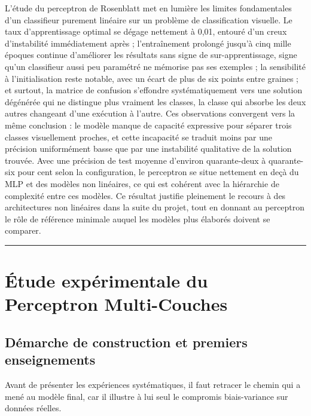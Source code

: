 \documentclass[11pt,a4paper]{report}
\begin{document}
L'étude du perceptron de Rosenblatt met en lumière les limites
fondamentales d'un classifieur purement linéaire sur un problème de
classification visuelle. Le taux d'apprentissage optimal se dégage
nettement à 0,01, entouré d'un creux d'instabilité immédiatement après ;
l'entraînement prolongé jusqu'à cinq mille époques continue d'améliorer
les résultats sans signe de sur-apprentissage, signe qu'un classifieur
aussi peu paramétré ne mémorise pas ses exemples ; la sensibilité à
l'initialisation reste notable, avec un écart de plus de six points
entre graines ; et surtout, la matrice de confusion s'effondre
systématiquement vers une solution dégénérée qui ne distingue plus
vraiment les classes, la classe qui absorbe les deux autres changeant
d'une exécution à l'autre. Ces observations convergent vers la même
conclusion : le modèle manque de capacité expressive pour séparer trois
classes visuellement proches, et cette incapacité se traduit moins par
une précision uniformément basse que par une instabilité qualitative de
la solution trouvée. Avec une précision de test moyenne d'environ
quarante-deux à quarante-six pour cent selon la configuration, le
perceptron se situe nettement en deçà du MLP et des modèles non
linéaires, ce qui est cohérent avec la hiérarchie de complexité entre
ces modèles. Ce résultat justifie pleinement le recours à des
architectures non linéaires dans la suite du projet, tout en donnant au
perceptron le rôle de référence minimale auquel les modèles plus
élaborés doivent se comparer.

\begin{center}\rule{0.5\linewidth}{0.5pt}\end{center}

\hypertarget{uxe9tude-expuxe9rimentale-du-perceptron-multi-couches}{%
\chapter{Étude expérimentale du Perceptron
Multi-Couches}\label{uxe9tude-expuxe9rimentale-du-perceptron-multi-couches}}

\hypertarget{duxe9marche-de-construction-et-premiers-enseignements}{%
\section{Démarche de construction et premiers
enseignements}\label{duxe9marche-de-construction-et-premiers-enseignements}}

Avant de présenter les expériences systématiques, il faut retracer le
chemin qui a mené au modèle final, car il illustre à lui seul le
compromis biais-variance sur données réelles.
\end{document}
